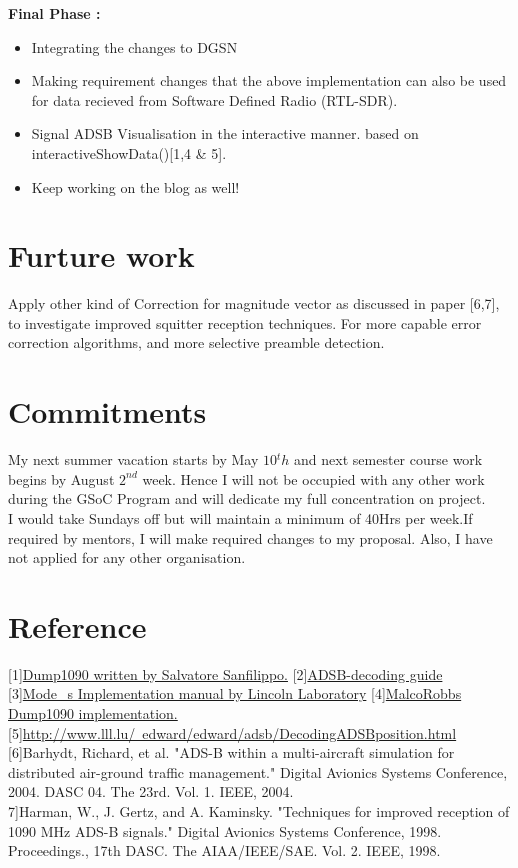 \documentclass[11pt,a4paper]{report}
\begin{document}
\textbf{Final Phase :}
\begin{itemize}
\item Integrating the changes to DGSN  
\item Making requirement changes that the above implementation can also be used for data recieved from Software Defined Radio (RTL-SDR).   
\item Signal ADSB Visualisation in the interactive manner. based on interactiveShowData()[1,4 \& 5]. 
\item Keep working on the blog as well!
   
\end{itemize} 
\section{Furture work}
Apply other kind of Correction for magnitude vector as discussed in paper [6,7], to investigate improved squitter reception techniques. For more capable error correction algorithms, and more selective preamble detection.
\section{Commitments}
My next summer vacation starts by May $10{^th}$ and next semester course work begins by August $2^{nd} $ week. Hence I will not be occupied with any other work during the GSoC Program and will dedicate my full concentration on project. \\
I would take Sundays off but will maintain a minimum of 40Hrs per week.If required by mentors, I will make required changes to my proposal. Also, I have not applied for any other organisation. 

  
\section{Reference}

[1]\href{https://github.com/antirez/dump1090}{Dump1090 written by Salvatore Sanfilippo.}
[2]\href{http://adsb-decode-guide.readthedocs.io/en/latest/}{ADSB-decoding guide}
[3]\href{https://www.ll.mit.edu/mission/aviation/publications/publication-files/atc-reports/Gertz_1984_ATC-117_WW-15318.pdf}{Mode\_s Implementation manual by Lincoln Laboratory}
[4]\href{https://github.com/MalcolmRobb/dump1090}{MalcoRobbs Dump1090 implementation.} 
[5]\href{http://www.lll.lu/~edward/edward/adsb/DecodingADSBposition.html}{http://www.lll.lu/~edward/edward/adsb/DecodingADSBposition.html\\}
[6]Barhydt, Richard, et al. "ADS-B within a multi-aircraft simulation for distributed air-ground traffic management." Digital Avionics Systems Conference, 2004. DASC 04. The 23rd. Vol. 1. IEEE, 2004.\\
7]Harman, W., J. Gertz, and A. Kaminsky. "Techniques for improved reception of 1090 MHz ADS-B signals." Digital Avionics Systems Conference, 1998. Proceedings., 17th DASC. The AIAA/IEEE/SAE. Vol. 2. IEEE, 1998.
\end{document}
